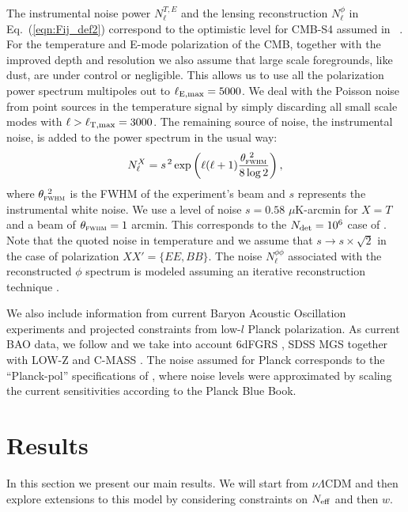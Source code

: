 \documentclass[aps,prd,reprint,superscriptaddress]{revtex4-1}
\newcommand\refeq[1]{Eq.~(\ref{eqn:#1})}
\begin{document}
The instrumental noise power $N_{\ell}^{T,E}$ and the lensing reconstruction $N_{\ell}^{\phi}$ in \refeq{Fij_def2} correspond to the optimistic level for CMB-S4 assumed in ~\cite{2013arXiv1309.5383A,wu:2014,2013PhRvD..87h3008H}.
For the temperature and E-mode polarization of the CMB, together with the improved depth and resolution we also assume that large scale foregrounds, like dust, are under control or negligible. This allows us to use all the polarization power spectrum multipoles out to $\ell_{\rm E,max}=5000$. We deal with the Poisson noise from point sources in the temperature signal by simply discarding all  small scale modes with $\ell>\ell_{\rm T,max}=3000$.
The remaining source of noise, the instrumental noise, is added to the power spectrum in the usual way:
 \begin{equation}
 	\centering
		N^{X}_\ell = s^{\, 2} \exp \left(\ell(\ell+1) \frac{\theta^{\ 2}_{\textsc{fwhm}}}{8\log2}\right),
	\label{eq:beamnoise}
\end{equation}
where $\theta^{\ 2}_{\textsc{fwhm}}$ is the FWHM of the experiment's beam and $s$ represents the instrumental white noise.
We use a level of noise $s = 0.58$ $\mu$K-arcmin for $X=T$ and a beam of $\theta_{\textsc{fwhm}}=1$ arcmin. This corresponds to the $N_{\rm det}=10^{6}$ case of \cite{wu:2014}. 
Note that the quoted noise in temperature and we assume that $s \rightarrow s\times \sqrt{2}$ in the case of polarization $ XX' = \{ EE, BB \}$. 
The noise $N_\ell^{\phi\phi}$ associated with the reconstructed $\phi$ spectrum is modeled assuming an iterative reconstruction technique \cite{seljak:2004}. 

We also include information from current Baryon Acoustic Oscillation experiments and projected constraints from low-$l$ Planck polarization. 
As current BAO data, we follow \cite{allison:2015} and we take into account 6dFGRS \cite{beutler:2011}, SDSS MGS \cite{ross:2015} together with LOW-Z and C-MASS \cite{anderson:2014}.
The noise assumed for Planck corresponds to the ``Planck-pol'' specifications of \cite{allison:2015}, where noise levels were approximated by scaling the current sensitivities according to the Planck Blue Book.


\section{Results \label{sec:results}}
In this section we present our main results. We will start from $\nu \Lambda$CDM and then explore extensions to this model by considering constraints on $N_{\rm eff}$ and then $w$.
\end{document}
